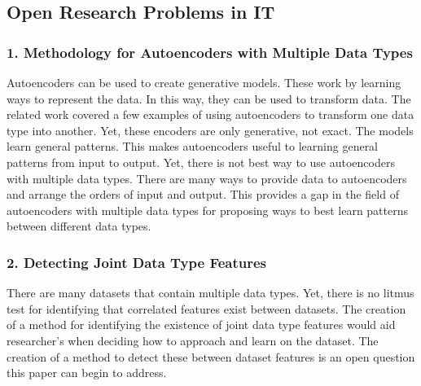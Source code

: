 \subsection{Open Research Problems in IT}

\subsubsection{1. Methodology for Autoencoders with Multiple Data Types}
Autoencoders can be used to create generative models. These work by learning ways to represent the data.  In this way, they can be used to transform data.  The related work covered a few examples of using autoencoders to transform one data type into another.  Yet, these encoders are only generative, not exact.  The models learn general patterns.  This makes autoencoders useful to learning general patterns from input to output.  Yet, there is not best way to use autoencoders with multiple data types.  There are many ways to provide data to autoencoders and arrange the orders of input and output.  This provides a gap in the field of autoencoders with multiple data types for proposing ways to best learn patterns between different data types.


\subsubsection{2. Detecting Joint Data Type Features}
There are many datasets that contain multiple data types.  Yet, there is no litmus test for identifying that correlated features exist between datasets.  The creation of a method for identifying the existence of joint data type features would aid researcher's when deciding how to approach and learn on the dataset.  The creation of a method to detect these between dataset features is an open question this paper can begin to address.
